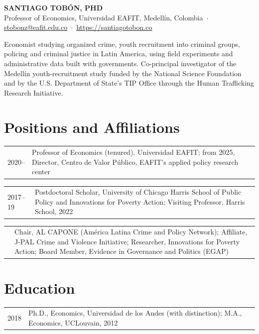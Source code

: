 \documentclass[10pt]{article}
\makeatletter
\newlength{\datecolwidth}\setlength{\datecolwidth}{1.25cm}
\newlength{\gapwidth}\setlength{\gapwidth}{0.3cm}
\newlength{\maincolwidth}\setlength{\maincolwidth}{\dimexpr\textwidth-\datecolwidth-\gapwidth\relax}
\newcommand{\cventry}[2]{%
  \begin{tabular}[t]{@{}p{\datecolwidth}@{\hspace{\gapwidth}}p{\maincolwidth}@{}}#1 & #2 \\\end{tabular}\vspace{0.05ex}\par}
\makeatother
\begin{document}
\begin{center}
{\large\textbf{SANTIAGO TOB\'{O}N, PHD}}\\[0.3ex]
Professor of Economics, Universidad EAFIT, Medell\'{i}n, Colombia \,$\cdot$\,
\href{mailto:stobonz@eafit.edu.co}{stobonz@eafit.edu.co} \,$\cdot$\, \url{https://santiagotobon.co}
\end{center}

\vspace{0.2ex}
Economist studying organized crime, youth recruitment into criminal groups, policing and criminal justice in Latin America, using field experiments and administrative data built with governments. Co-principal investigator of the Medell\'{i}n youth-recruitment study funded by the National Science Foundation and by the U.S. Department of State's TIP Office through the Human Trafficking Research Initiative.

\section*{Positions and Affiliations}
\cventry{2020--}{Professor of Economics (tenured), Universidad EAFIT; from 2025, Director, Centro de Valor P\'{u}blico, EAFIT's applied policy research center}
\cventry{2017--19}{Postdoctoral Scholar, University of Chicago Harris School of Public Policy and Innovations for Poverty Action; Visiting Professor, Harris School, 2022}
\cventry{}{Chair, AL CAPONE (Am\'{e}rica Latina Crime and Policy Network); Affiliate, J-PAL Crime and Violence Initiative; Researcher, Innovations for Poverty Action; Board Member, Evidence in Governance and Politics (EGAP)}

\section*{Education}
\cventry{2018}{Ph.D., Economics, Universidad de los Andes (with distinction); M.A., Economics, UCLouvain, 2012}
\end{document}
